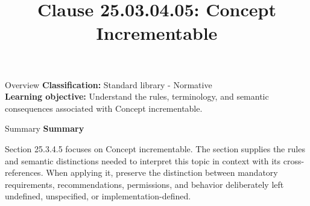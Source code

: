 \documentclass[10pt,letterpaper]{article}
\title{Clause 25.03.04.05: Concept Incrementable}
\author{}
\date{}
\begin{document}
\maketitle
\begin{CornellOverviewBox}{Overview}
\textbf{Classification:} Standard library - Normative\\[2pt]
\textbf{Learning objective:} Understand the rules, terminology, and semantic consequences associated with Concept incrementable.
\end{CornellOverviewBox}\begin{CornellSummaryBox}{Summary}
{\sffamily\bfseries\color{Accent} Summary}\par\vspace{3pt}Section 25.3.4.5 focuses on Concept incrementable. The section supplies the rules and semantic distinctions needed to interpret this topic in context with its cross-references. When applying it, preserve the distinction between mandatory requirements, recommendations, permissions, and behavior deliberately left undefined, unspecified, or implementation-defined.
\end{CornellSummaryBox}
\end{document}
